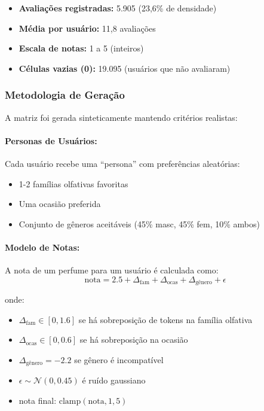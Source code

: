 \documentclass[12pt,a4paper]{article}
\begin{document}
\begin{itemize}
    \item \textbf{Avaliações registradas:} 5.905 (23,6\% de densidade)
    \item \textbf{Média por usuário:} 11,8 avaliações
    \item \textbf{Escala de notas:} 1 a 5 (inteiros)
    \item \textbf{Células vazias (0):} 19.095 (usuários que não avaliaram)
\end{itemize}

\subsubsection{Metodologia de Geração}

A matriz foi gerada sinteticamente mantendo critérios realistas:

\paragraph{Personas de Usuários:}
Cada usuário recebe uma ``persona'' com preferências aleatórias:
\begin{itemize}
    \item 1-2 famílias olfativas favoritas
    \item Uma ocasião preferida
    \item Conjunto de gêneros aceitáveis (45\% masc, 45\% fem, 10\% ambos)
\end{itemize}

\paragraph{Modelo de Notas:}
A nota de um perfume para um usuário é calculada como:
\begin{equation}
\text{nota} = 2.5 + \Delta_{\text{fam}} + \Delta_{\text{ocas}} + \Delta_{\text{gênero}} + \epsilon
\end{equation}

onde:
\begin{itemize}
    \item $\Delta_{\text{fam}} \in [0, 1.6]$ se há sobreposição de tokens na família olfativa
    \item $\Delta_{\text{ocas}} \in [0, 0.6]$ se há sobreposição na ocasião
    \item $\Delta_{\text{gênero}} = -2.2$ se gênero é incompatível
    \item $\epsilon \sim \mathcal{N}(0, 0.45)$ é ruído gaussiano
    \item nota final: $\text{clamp}(\text{nota}, 1, 5)$
\end{itemize}
\end{document}
